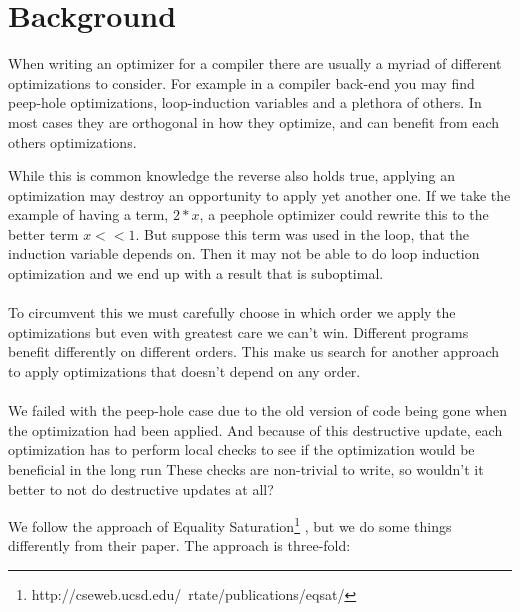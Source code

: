 
\section{Background}
When writing an optimizer for a compiler there are usually a myriad of different optimizations to consider.
For example in a compiler back-end you may find peep-hole
optimizations, loop-induction variables and a plethora of others. In most cases 
they are orthogonal in how they optimize, and can benefit from each others optimizations.

While this is common knowledge the reverse also holds true, applying an optimization 
may destroy an opportunity to apply yet another one. If we take the example of having a 
term, $ 2 * x $, a peephole optimizer could rewrite this to the better term 
$ x << 1$. But suppose this term was used in the loop, that the induction variable
depends on. Then it may not be able to do loop induction optimization and we end up
with a result that is suboptimal.%
\paragraph{}
To circumvent this we must carefully choose in which order we apply the optimizations
but even with greatest care we can't win. Different programs benefit differently
on different orders. This make us search for another approach to apply optimizations
that doesn't depend on any order. 
\paragraph{}
We failed with the peep-hole case due to the old version of code being gone when 
the optimization had been applied.
And because of this destructive update, each
optimization has to perform local checks to see if the optimization would be beneficial in the long run %
These checks are non-trivial to write, so wouldn't it better to not do destructive
updates at all?

We follow the approach of Equality Saturation\footnote{http://cseweb.ucsd.edu/~rtate/publications/eqsat/}
, but we do some things differently from their paper. The approach is three-fold:

